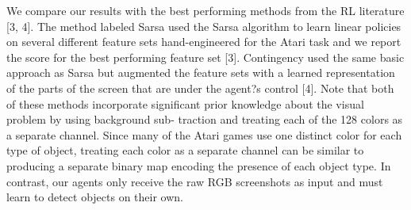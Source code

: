 We compare our results with the best performing methods from the RL literature [3, 4]. The method labeled Sarsa used the Sarsa algorithm to learn linear policies on several different feature sets hand-engineered for the Atari task and we report the score for the best performing feature set [3]. Contingency used the same basic approach as Sarsa but augmented the feature sets with a learned representation of the parts of the screen that are under the agent?s control [4]. Note that both of these methods incorporate significant prior knowledge about the visual problem by using background sub- traction and treating each of the 128 colors as a separate channel. Since many of the Atari games use one distinct color for each type of object, treating each color as a separate channel can be similar to producing a separate binary map encoding the presence of each object type. In contrast, our agents only receive the raw RGB screenshots as input and must learn to detect objects on their own.


